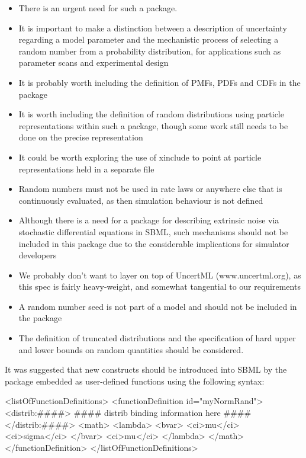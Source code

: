 \documentclass[draftspec]{sbmlpkgspec}
\begin{document}
\begin{itemize}
\item There is an urgent need for such a package.
\item It is important to make a distinction between a description of
  uncertainty regarding a model parameter and the mechanistic process
  of selecting a random number from a probability distribution, for
  applications such as parameter scans and experimental design
\item It is probably worth including the definition of PMFs, PDFs and CDFs in the package
\item It is worth including the definition of random distributions using particle representations within such a package, though some work
 still needs to be done on the precise representation
\item It could be worth exploring the use of xinclude to point at particle
representations held in a separate file
\item Random numbers must not be used in rate laws or anywhere else that
 is continuously evaluated, as then simulation behaviour is not
 defined
\item Although there is a need for a package for describing extrinsic
 noise via stochastic differential equations in SBML, such mechanisms
 should not be included in this package due to the considerable
 implications for simulator developers
\item We probably don't want to layer on top of UncertML
 (www.uncertml.org), as this spec is fairly heavy-weight, and
 somewhat tangential to our requirements
\item A random number seed is not part of a model and should not be
 included in the package
\item The definition of truncated distributions and the specification of
 hard upper and lower bounds on random quantities should be
 considered.
\end{itemize}

It was suggested that new constructs should be introduced into SBML by
the package embedded as user-defined functions using the following
syntax:

\begin{example}
<listOfFunctionDefinitions>
  <functionDefinition id="myNormRand">
    <distrib:####>
      #### distrib binding information here ####
    </distrib:####>
    <math>
      <lambda>
        <bvar>
          <ci>mu</ci>
          <ci>sigma</ci>
        </bvar>
        <ci>mu</ci>
      </lambda>
    </math>
  </functionDefinition>
</listOfFunctionDefinitions>
\end{example}
\end{document}
